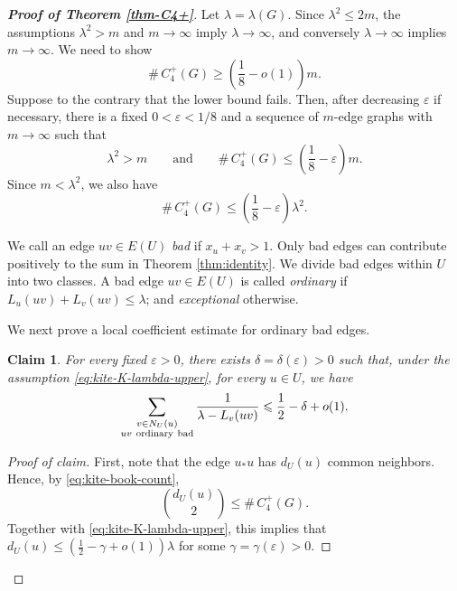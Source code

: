 \documentclass[11pt,a4paper]{article}
\newtheorem{claim}[theorem]{Claim}
\theoremstyle{definition}
\theoremstyle{plain}
\renewcommand{\le}{\leqslant}
\renewcommand{\ge}{\geqslant}
\begin{document}
\begin{proof}[{\bf Proof of Theorem \ref{thm-C4+}}] 
Let $ \lambda=\lambda(G)$. 
Since $  \lambda^2\le 2m$, 
the assumptions \(\lambda^2>m\) and \(m\to\infty\) imply
\(\lambda\to\infty\), and conversely \(\lambda\to\infty\) implies
\(m\to\infty\). We need to show 
$$ 
\texttt{\#}\,C_4^+ (G)\ge \left( 
\frac{1}{8}-o(1) \right)m.$$ 
Suppose to the contrary that the lower bound fails.  Then, after decreasing
\(\varepsilon\) if necessary, there is a fixed
\(0<\varepsilon<1/8\) and a sequence of \(m\)-edge graphs with \(m\to\infty\)
such that
\begin{equation*}
        \lambda^2>m
        \qquad\text{and}\qquad
        \texttt{\#}\,C_4^+ (G) \le \left(\frac18-\varepsilon\right)m .
\end{equation*} 
Since \(m<\lambda^2\), we also have
\begin{equation}\label{eq:kite-K-lambda-upper}
        \texttt{\#}\,C_4^+ (G) \le \left(\frac18-\varepsilon\right)\lambda^2.
\end{equation}




We call an edge \(uv\in E(U)\) \emph{bad} if
$   x_u+x_v>1$. 
Only bad edges can contribute positively to the sum in Theorem \ref{thm:identity}. 
We divide bad edges within $U$ into two classes.  A bad edge \(uv\in E(U)\) is called
\emph{ordinary} if
$   L_u(uv)+L_v(uv)\le \lambda$; 
and \emph{exceptional} otherwise.



We next prove a local coefficient estimate for ordinary bad edges.

\begin{claim}\label{lem:kite-local-coeff}
For every fixed \(\varepsilon>0\), there exists
\(\delta=\delta(\varepsilon)>0\) such that, under the assumption
\eqref{eq:kite-K-lambda-upper}, for every \(u\in U\), we have 
\[
        \sum_{\substack{v\in N_U(u)\\ uv\ {\rm ordinary\ bad}}}
        \frac{1}{\lambda-L_v(uv)}
        \le
        \frac12-\delta+o(1).
\]
\end{claim}

\begin{proof}[Proof of claim]
First, note that the edge \(u_*u\) has \(d_U(u)\) common neighbors.  Hence, by
\eqref{eq:kite-book-count},
\[
     {d_U(u)\choose2} \le \texttt{\#}\,C_4^+ (G).
\]
Together with \eqref{eq:kite-K-lambda-upper}, this implies that
$   d_U(u)\le \left(\frac12-\gamma+o(1)\right)\lambda$ 
for some \(\gamma=\gamma(\varepsilon)>0\).


\end{proof}
\end{proof}
\end{document}
